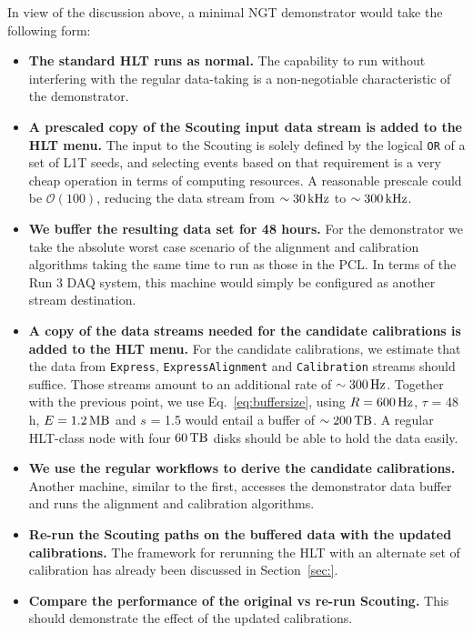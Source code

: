 In view of the discussion above, a minimal NGT demonstrator would take the following form:
\begin{itemize}
\item \textbf{The standard HLT runs as normal.} 
The capability to run without interfering with the regular data-taking is
a non-negotiable characteristic of the demonstrator.
\item \textbf{A prescaled copy of the Scouting input data stream is added to the HLT menu.}
The input to the Scouting is solely defined by the logical \texttt{OR} of a set of L1T seeds, and
selecting events based on that requirement is a very cheap operation in terms of computing resources.
A reasonable prescale could be $\mathcal{O}(100)$, reducing the data stream 
from $\sim 30\,\text{kHz}$
to $\sim 300\,\text{kHz}$.
\item \textbf{We buffer the resulting data set for 48 hours.}
For the demonstrator we take the absolute worst case scenario of the alignment and calibration algorithms taking the same time to run as those in the PCL.
In terms of the Run 3 DAQ system, this machine would simply be configured as another stream destination.
\item \textbf{A copy of the data streams needed for the candidate calibrations is added to the HLT menu.}
For the candidate calibrations, we estimate that 
the data from \texttt{Express}, \texttt{ExpressAlignment} and \texttt{Calibration} streams should suffice.
Those streams amount to an additional rate of $\sim 300\,\text{Hz}$.
Together with the previous point, we
use Eq.~\ref{eq:buffersize}, using 
$R = 600\,\text{Hz}$,
$\tau$ = 48 h,
$E = 1.2\,\text{MB}$ and
$s$ = 1.5
would entail a buffer of $\sim 200\,\text{TB}$.
A regular HLT-class node with four $60\,\text{TB}$ disks should be able to hold the data easily.
\item \textbf{We use the regular workflows to derive the candidate calibrations.}
Another machine, similar to the first, accesses the demonstrator data buffer
and
runs the alignment and calibration algorithms.
\item \textbf{Re-run the Scouting paths on the buffered data with the updated calibrations.}
The framework for rerunning the HLT with an alternate set of calibration has already been discussed in Section~\ref{sec:}.
\item \textbf{Compare the performance of the original vs re-run Scouting.}
This should demonstrate the effect of the updated calibrations. 
\end{itemize}